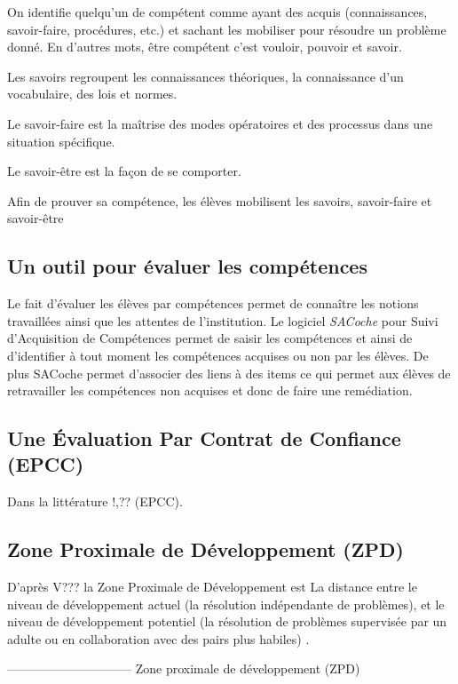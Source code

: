 On identifie quelqu'un de compétent comme ayant des acquis (connaissances, savoir-faire, procédures, etc.) et sachant les mobiliser pour résoudre un problème donné.
En d'autres mots, être compétent c'est vouloir, pouvoir et savoir.

Les savoirs regroupent les connaissances théoriques, la connaissance d'un vocabulaire, des lois et normes.

Le savoir-faire est la maîtrise des modes opératoires et des processus dans une situation spécifique.

Le savoir-être est la façon de se comporter.

Afin de prouver sa compétence, les élèves mobilisent les savoirs, savoir-faire et savoir-être

\subsection{Un outil pour évaluer les compétences}

Le fait d'évaluer les élèves par compétences permet de connaître les notions travaillées ainsi que les attentes de l'institution.
Le logiciel \textit{SACoche} pour Suivi d'Acquisition de Compétences permet de saisir les compétences et ainsi de d'identifier à tout moment les compétences acquises ou non par les élèves.
De plus SACoche permet d'associer des liens à des items ce qui permet aux élèves de retravailler les compétences non acquises et donc de faire une remédiation.


\subsection{Une Évaluation Par Contrat de Confiance (EPCC)}

Dans la littérature !,??  (EPCC).





\subsection{Zone Proximale de Développement (ZPD)}

D'après V??? la Zone Proximale de Développement  est \og La distance entre le niveau de développement actuel (la résolution indépendante de problèmes), et le niveau de développement potentiel (la résolution de problèmes supervisée par un adulte ou en collaboration avec des pairs plus habiles) \fg.
 

------------------------------
Zone proximale de développement (ZPD) 


